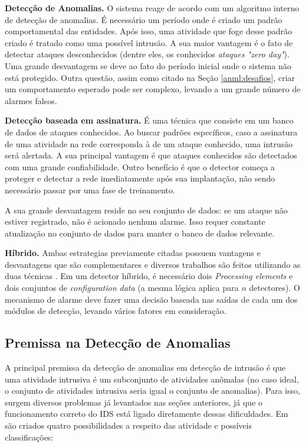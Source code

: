 \textbf{Detecção de Anomalias.} O sistema reage de acordo com um algoritmo interno de detecção de anomalias. É necessário um período onde é criado um padrão comportamental das entidades. Após isso, uma atividade que foge desse padrão criado é tratado como uma possível intrusão. A sua maior vantagem é o fato de detectar ataques desconhecidos (dentre eles, os conhecidos \textit{ataques "zero day"}).    
Uma grande desvantagem se deve ao fato do período inicial onde o sistema não está protegido. Outra questão, assim como citado na Seção \ref{anml:desafios}, criar um comportamento esperado pode ser complexo, levando a um grande número de alarmes falsos.

\textbf{Detecção baseada em assinatura.} É uma técnica que consiste em um banco de dados de ataques conhecidos. Ao buscar padrões específicos, caso a assinatura de uma atividade na rede corresponda à de um ataque conhecido, uma intrusão será alertada. A sua principal vantagem é que ataques conhecidos são detectados com uma grande confiabilidade. Outro benefício é que o detector começa a proteger e detectar a rede imediatamente após sua implantação, não sendo necessário passar por uma fase de treinamento.

A sua grande desvantagem reside no seu conjunto de dados: se um ataque não estiver registrado, não é acionado nenhum alarme. Isso requer constante atualização no conjunto de dados para manter o banco de dados relevante.

\textbf{Híbrido.} Ambas estrategias previamente citadas possuem vantagens e desvantagens que são complementares e diversos trabalhos são feitos utilizando as duas técnicas \cite{Patcha2007}.
Em um detector híbrido, é necessário dois \textit{Processing elements} e dois conjuntos de \textit{configuration data} (a mesma lógica aplica para $n$ detectores). O mecanismo de alarme deve fazer uma decisão baseada nas saídas de cada um dos módulos de detecção, levando vários fatores em consideração.


\subsection{Premissa na Detecção de Anomalias}
\label{ids:prem}
A principal premissa da detecção de anomalias em detecção de intrusão é que uma atividade intrusiva é um subconjunto de atividades anômalas \cite{purdue} (no caso ideal, o conjunto de atividades intrusiva seria igual o conjunto de anomalias). Para isso, surgem  diversos problemas já levantados nas seções anteriores, já que o funcionamento correto do IDS está ligado diretamente dessas dificuldades. Em \cite{purdue} são criados quatro possibilidades a respeito das atividade e possíveis classificações:


